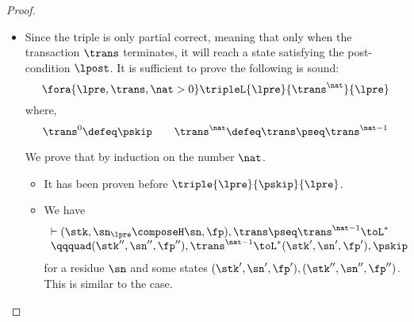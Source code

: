 \begin{proof}
\begin{itemize}
\item {}
Since the triple is only partial correct, 
meaning that only when the transaction \( \trans \) terminates, it will reach a state satisfying the post-condition \( \lpost \).
It is sufficient to prove the following is sound:
\[
    \fora{\lpre, \trans, \nat > 0} \tripleL{\lpre}{\trans^{\nat}}{\lpre}
\]
where,
\[
    \trans^{0} \defeq  \pskip \qquad
    \trans^{\nat} \defeq  \trans \pseq \trans^{\nat - 1} 
\]

We prove that by induction on the number \( \nat \).
\begin{itemize}
    \item {} It has been proven before \( \triple{\lpre}{\pskip}{\lpre} \).
    \item {} We have 
    \[ 
        \begin{array}{l}
        \vdash (\stk, \sn_\lpre \composeH \sn, \fp), \trans \pseq \trans^{\nat - 1} \toL^{*} \\
        \qqquad (\stk'', \sn'', \fp''), \trans^{\nat - 1} \toL^{*} (\stk', \sn', \fp'), \pskip  
        \end{array}
    \]
    for a residue \( \sn \) and some states \( ( \stk', \sn', \fp' ), ( \stk'', \sn'', \fp'' ) \).
    This is similar to the  case.
\end{itemize}


\end{itemize}
\end{proof}
